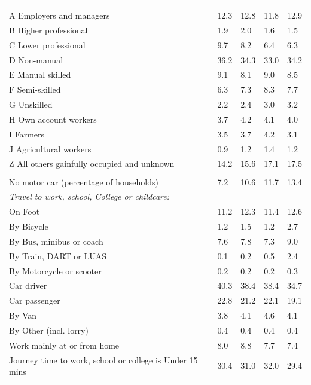 \documentclass{article}
\begin{document}
\begin{table}[h]
\begin{tabular}{KTTTT}
\hline
    \\ 
    \hline
A Employers and managers & 12.3& 12.8& 11.8& 12.9\\
B Higher professional & 1.9& 2.0& 1.6& 1.5\\
C Lower professional & 9.7& 8.2& 6.4& 6.3\\
D Non-manual & 36.2& 34.3& 33.0& 34.2\\
E Manual skilled & 9.1& 8.1& 9.0& 8.5\\
F Semi-skilled & 6.3& 7.3& 8.3& 7.7\\
G Unskilled & 2.2& 2.4& 3.0& 3.2\\
H Own account workers & 3.7& 4.2& 4.1& 4.0\\
I Farmers & 3.5& 3.7& 4.2& 3.1\\
J Agricultural workers & 0.9& 1.2& 1.4& 1.2\\
Z All others gainfully occupied and unknown & 14.2& 15.6& 17.1& 17.5\\
\hline
{}\hline
    \\ 
    \hline
No motor car (percentage of households) &  7.2& 10.6& 11.7& 
13.4\\
    \hline 
\emph{Travel to work, school, College or childcare:} & & & \\
\quad On Foot & 11.2& 12.3& 11.4& 12.6\\ 
\quad By Bicycle & 1.2& 1.5& 1.2& 2.7\\ 
\quad By Bus, minibus or coach & 7.6& 7.8& 7.3& 9.0\\
\quad By Train, DART or LUAS & 0.1& 0.2& 0.5& 2.4\\
\quad By Motorcycle or scooter & 0.2& 0.2& 0.2& 0.3\\
\quad Car driver & 40.3 & 38.4& 38.4& 34.7\\
\quad Car passenger & 22.8& 21.2& 22.1& 19.1\\
\quad By Van & 3.8& 4.1& 4.6& 4.1\\
\quad By Other (incl. lorry) & 0.4& 0.4& 0.4& 0.4\\
    \hline
Work mainly at or from home & 8.0& 8.8& 7.7& 7.4\\
Journey time to work, school or college is Under 15 mins & 30.4& 31.0& 32.0& 29.4\\

\end{tabular}
\end{table}
\end{document}
